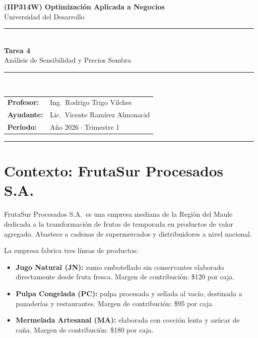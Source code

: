 \documentclass[12pt,a4paper]{article}
\begin{document}

\begin{center}
    {\Large\bfseries\color{uddblue}
     (IIP314W) Optimización Aplicada a Negocios}\\[0.4em]
    {\large Universidad del Desarrollo}\\[0.8em]
    \noindent\rule{\linewidth}{1.5pt}\\[0.5em]
    {\LARGE\bfseries Tarea 4}\\[0.3em]
    {\large Análisis de Sensibilidad y Precios Sombra}\\[0.5em]
    \noindent\rule{\linewidth}{1.5pt}\\[0.8em]
    \begin{tabular}{@{}ll@{}}
        \textbf{Profesor:} & Ing.\ Rodrigo Trigo Vilches \\[0.3em]
        \textbf{Ayudante:} & Lic.\ Vicente Ramírez Almonacid \\[0.3em]
        \textbf{Período:}  & Año 2026\,--\,Trimestre 1
    \end{tabular}
\end{center}

\vspace{1em}
\noindent\rule{\linewidth}{0.4pt}
\vspace{0.5em}

\section*{Contexto: FrutaSur Procesados S.A.}

FrutaSur Procesados S.A.\ es una empresa mediana de la Región del Maule dedicada
a la transformación de frutas de temporada en productos de valor agregado.
Abastece a cadenas de supermercados y distribuidores a nivel nacional.

La empresa fabrica tres líneas de productos:

\begin{itemize}
    \item \textbf{Jugo Natural (JN):} zumo embotellado sin conservantes elaborado
          directamente desde fruta fresca.
          Margen de contribución: \$120 por caja.
    \item \textbf{Pulpa Congelada (PC):} pulpa procesada y sellada al vacío,
          destinada a panaderías y restaurantes.
          Margen de contribución: \$95 por caja.
    \item \textbf{Mermelada Artesanal (MA):} elaborada con cocción lenta y
          azúcar de caña.
          Margen de contribución: \$180 por caja.
\end{itemize}
\end{document}
